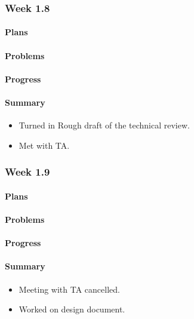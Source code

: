 \documentclass[onecolumn, draftclsnofoot,10pt, compsoc]{article}
\begin{document}
		\subsubsection{Week 1.8}

			\paragraph{Plans} \hfill \break

		    \paragraph{Problems} \hfill \break

		    \paragraph{Progress} \hfill \break

		    \paragraph{Summary}
		    \begin{itemize}
		    \item Turned in Rough draft of the technical review.
            \item Met with TA.
            \end{itemize}


		\subsubsection{Week 1.9}

			\paragraph{Plans} \hfill \break

		    \paragraph{Problems} \hfill \break

		    \paragraph{Progress} \hfill \break

		    \paragraph{Summary} \hfill \break
		    \begin{itemize}
                \item Meeting with TA cancelled.
                \item Worked on design document. \\
		     \end{itemize}
\end{document}
